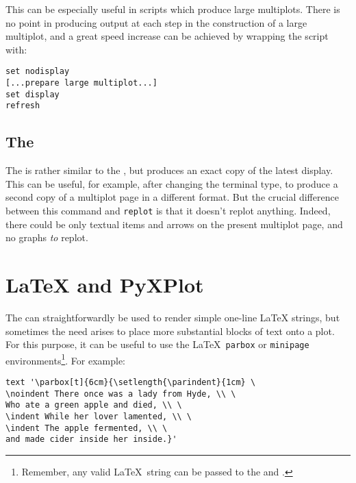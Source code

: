 This can be especially useful in scripts which produce large multiplots. There
is no point in producing output at each step in the construction of a large
multiplot, and a great speed increase can be achieved by wrapping the script
with:

\begin{verbatim}
set nodisplay
[...prepare large multiplot...]
set display
refresh
\end{verbatim}

\subsection{The }

 The  is rather similar to the
, but produces an exact copy of the latest display. This can be
useful, for example, after changing the terminal type, to produce a second copy
of a multiplot page in a different format. But the crucial difference between
this command and {\tt replot} is that it doesn't replot anything. Indeed, there
could be only textual items and arrows on the present multiplot page, and no
graphs {\it to} replot.

\section{LaTeX and PyXPlot}

The  can straightforwardly be used to render simple one-line
\LaTeX{} strings, but sometimes the need arises to place more
substantial blocks of text onto a plot. For this purpose, it can be useful to
use the \LaTeX\ {\tt parbox} or {\tt minipage} environments\footnote{Remember,
any valid \LaTeX\ string can be passed to the  and .}. For example:

\begin{verbatim}
text '\parbox[t]{6cm}{\setlength{\parindent}{1cm} \
\noindent There once was a lady from Hyde, \\ \
Who ate a green apple and died, \\ \
\indent While her lover lamented, \\ \
\indent The apple fermented, \\ \
and made cider inside her inside.}'
\end{verbatim}

\begin{center}
\end{center}

